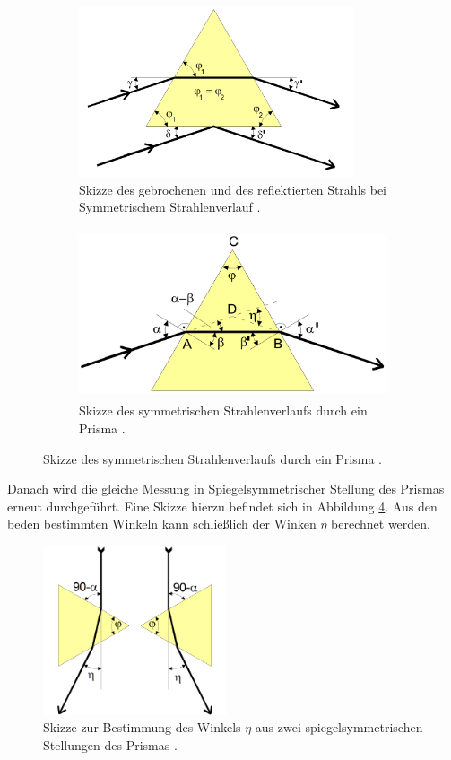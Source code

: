 \begin{figure}[H]
  \centering
  \begin{subfigure}{0.48\textwidth}
    \includegraphics[height=5cm]{data/eta1.png}
    \caption{Skizze des gebrochenen und des reflektierten Strahls bei Symmetrischem
    Strahlenverlauf \cite{Versuchsanleitung}.}
    \label{fig:eta1}
  \end{subfigure}
  \begin{subfigure}{0.48\textwidth}
    \includegraphics[height=5cm]{data/symmetrisch.png}
    \caption{Skizze des symmetrischen Strahlenverlaufs durch ein Prisma \cite{Versuchsanleitung}.}
    \label{fig:symmetrisch}
  \end{subfigure}
\end{figure}

Danach wird die gleiche Messung in Spiegelsymmetrischer Stellung des Prismas erneut
durchgeführt. Eine Skizze hierzu befindet sich in Abbildung \ref{fig:eta2}.
Aus den beden bestimmten Winkeln kann schließlich der Winken $\eta$ berechnet werden.

\begin{figure}[H]
  \centering
  \includegraphics[height=5cm]{data/eta2.png}
  \caption{Skizze zur Bestimmung des Winkels $\eta$ aus zwei spiegelsymmetrischen Stellungen
  des Prismas \cite{Versuchsanleitung}.}
  \label{fig:eta2}
\end{figure}


